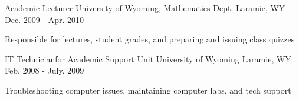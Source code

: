 \begin{cventries}

\cventry
{Academic Lecturer} %
{University of Wyoming, Mathematics Dept.} %
{Laramie, WY} %
{Dec. 2009 - Apr. 2010} %
{ %
\begin{cvitems}
\item {Responsible for lectures, student grades, and preparing and issuing class quizzes}
\end{cvitems}
}


\cventry
{IT Technicianfor Academic Support Unit} %
{University of Wyoming} %
{Laramie, WY} %
{Feb. 2008 - July. 2009} %
{ %
\begin{cvitems}
\item {Troubleshooting computer issues, maintaining computer labs, and tech support}
\end{cvitems}
}


\end{cventries}